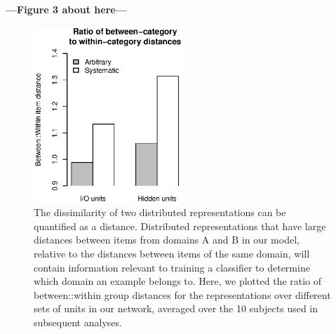 \textbf{---Figure 3 about here---}
\begin{figure}
\centering
\includegraphics[width=0.5\textwidth]{figures/between_within_dist.eps}
\caption{\label{fig.between_within_dist} The dissimilarity of two distributed representations can be quantified as a distance. Distributed representations that have large distances between items from domains A and B in our model, relative to the distances between items of the same domain, will contain information relevant to training a classifier to determine which domain an example belongs to. Here, we plotted the ratio of between::within group distances for the representations over different sets of units in our network, averaged over the 10 subjects used in subsequent analyses. }
\end{figure}

